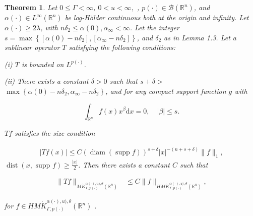 \documentclass[oneside,reqno]{amsart}
\newtheorem{theorem}{Theorem}[section]
\numberwithin{equation}{section}
\theoremstyle{definition}
\begin{document}
\begin{theorem}
    


 Let $0 \leq \Gamma<\infty$,  $0<u<\infty,$ , $p(\cdot) \in \mathcal{B}\left(\mathbb{R}^{n}\right)$, and $\alpha(\cdot) \in L^{\infty}\left(\mathbb{R}^{n}\right)$ be log-H\"older continuous both at the origin and infinity.  Let  $\alpha(\cdot)\geq 2\lambda$, with $n \delta_{2} \leq  \alpha(0), \alpha_{\infty}<\infty$. Let the integer $s=\max \left\{\left[\alpha(0)-n \delta_{2}\right],\left[\alpha_{\infty}-n \delta_{2}\right]\right\}$, and $\delta_{2}$ as in Lemma 1.3. Let a sublinear operator $T$ satisfying the following conditions:
 
 


(i) $T$ is bounded on $L^{p(\cdot)}$.

(ii) There exists a constant $\delta>0$ such that $s+\delta>$ $\max \left\{\alpha(0)-n \delta_{2}, \alpha_{\infty}-n \delta_{2}\right\}$, and for any compact support function $g$ with


\begin{equation*}
\int_{\mathbb{R}^{n}} f(x) x^{\beta} \mathrm{d} x=0, \quad|\beta| \leq  s. 
\end{equation*}


$Tf$ satisfies the size condition

\[
\begin{array}{r}
|T f(x)| \leq  C(\operatorname{diam}(\operatorname{supp} f))^{s+\delta}|x|^{-(n+s+\delta)}\|f\|_{1}  , 
\end{array}
\]
 $\operatorname{dist}(x, \text { supp } f) \geqslant \frac{|x|}{2}$. 
Then there exists a constant $C$ such that


\begin{align*}
\|T f\|_{M \dot{K} ^{\alpha(\cdot),u),\theta}_{ \Gamma, p(\cdot)}(\mathbb{R}^n)} & \leq  C\|f\|_{H M \dot{K} ^{\alpha(\cdot),u),\theta}_{ \Gamma, p(\cdot)}(\mathbb{R}^n)} ,
\end{align*}


for $f \in H {M \dot{K} ^{\alpha(\cdot),u),\theta}_{ \Gamma, p(\cdot)}(\mathbb{R}^n)}$ .



\end{theorem}
\end{document}
